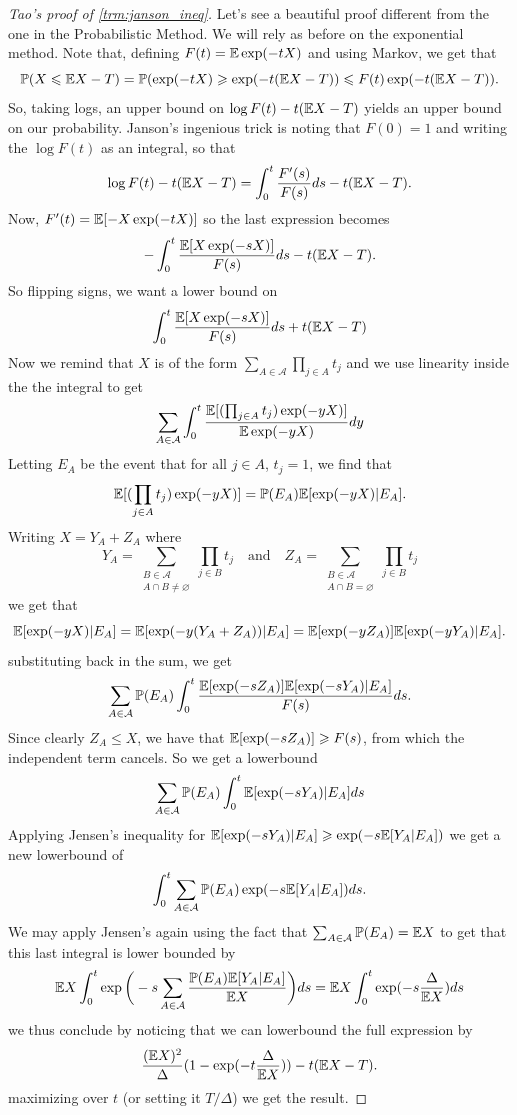 \begin{proof}[Tao's proof of \ref{trm:janson_ineq}]
    Let's see a beautiful proof different from the one 
    in the Probabilistic Method. We will rely as before on the exponential method.
    Note that, defining $F(t) = \mathbb{E} \exp(-tX)$ and using Markov, we get that 
    \[
    \mathbb{P}(X \leqslant \mathbb{E} X - T) = \mathbb{P}(\exp(-tX) \geqslant \exp(-t (\mathbb{E} X - T)) 
    \leqslant F(t) \exp(-t(\mathbb{E} X - T)).
    \]
    So, taking logs, an upper bound on $\log F(t) -t(\mathbb{E} X - T)$ yields 
    an upper bound on our probability. Janson's ingenious trick is noting 
    that $F(0) = 1$ and writing the $\log F(t)$ as an integral, so that
    \[
    \log F(t) -t(\mathbb{E} X - T) = \int_0^t \frac{F'(s)}{F(s)} ds -t(\mathbb{E} X - T).
    \]
    Now, $F'(t) = \mathbb{E}[-X \exp(-tX)]$ so the last expression becomes 
    \[
        - \int_0^t \frac{\mathbb{E}[X \exp(-sX)]}{F(s)} ds - t(\mathbb{E} X - T).
    \]
    So flipping signs, we want a lower bound on 
    \[
        \int_0^t \frac{\mathbb{E}[X \exp(-sX)]}{F(s)} ds + t(\mathbb{E} X - T)
    \]
    Now we remind that $X$ is of the form $\sum_{A \in \mathcal{A}} \prod_{j \in A} t_j$
    and we use linearity inside the the integral to get
    \[
        \sum_{A \in \mathcal{A}}\int_0^t \frac{\mathbb{E}[(\prod_{j \in A} t_j)\exp(-yX)]}{\mathbb{E} \exp(-yX)} dy
    \]
    Letting $E_A$ be the event that for all $j \in A$, $t_j = 1$, we find that 
    \[
        \mathbb{E}[(\prod_{j \in A} t_j) \exp(-yX)] = \mathbb{P}(E_A)\mathbb{E}[\exp(-yX) | E_A].
    \]
    Writing $X = Y_A + Z_A$ where 
    \[
    Y_A = \sum_{\substack{B \in \mathcal{A}\\ A \cap B \neq \varnothing}} \prod_{j \in B} t_j
    \quad \text{and} \quad 
    Z_A = \sum_{\substack{B \in \mathcal{A}\\ A \cap B = \varnothing}} \prod_{j \in B} t_j
    \]
    we get that 
    \[
        \mathbb{E}[\exp(-yX) | E_A] = \mathbb{E}[\exp(-y(Y_A + Z_A)) | E_A] = 
        \mathbb{E}[\exp(-yZ_A)] \mathbb{E}[\exp(-y Y_A) | E_A].
    \]
    substituting back in the sum, we get 
    \[
        \sum_{A \in \mathcal{A}} \mathbb{P}(E_A) \int_0^t \frac{\mathbb{E}[\exp(-sZ_A)]\mathbb{E}[\exp(-s Y_A)|E_A]}{F(s)} ds.
    \]
    Since clearly $Z_A \leq X$, we have that $\mathbb{E}[\exp(-sZ_A)] \geqslant F(s)$, from which 
    the independent term cancels. So we get a lowerbound 
    \[
    \sum_{A \in \mathcal{A}} \mathbb{P}(E_A) \int_0^t \mathbb{E}[\exp(-s Y_A)|E_A] ds
    \]
    Applying Jensen's inequality for $\mathbb{E}[\exp(-s Y_A)|E_A] \geqslant \exp(-s \mathbb{E}[Y_A | E_A])$
    we get a new lowerbound of 
    \[
        \int_0^t \sum_{A \in \mathcal{A}} \mathbb{P}(E_A) \exp(-s \mathbb{E}[Y_A | E_A]) ds.
    \]
    We may apply Jensen's again using the fact that $\sum_{A \in \mathcal{A}} \mathbb{P}(E_A) = \mathbb{E} X$
    to get that this last integral is lower bounded by 
    \[
        \mathbb{E} X \int_0^t \exp\bigg( -s\sum_{A \in \mathcal{A}} \frac{\mathbb{P}(E_A)\mathbb{E}[Y_A|E_A]}{\mathbb{E} X}\bigg) ds = \mathbb{E} X \int_0^t \exp(-s \frac{\Delta}{\mathbb{E} X}) ds  
    \]
    we thus conclude by noticing that we can lowerbound the full expression by 
    \[
        \frac{(\mathbb{E} X)^2}{\Delta} (1 - \exp(-t \frac{\Delta}{\mathbb{E} X})) -t(\mathbb{E} X - T).
    \]
    maximizing over $t$ (or setting it $T/\Delta$) we get the result.
\end{proof}
